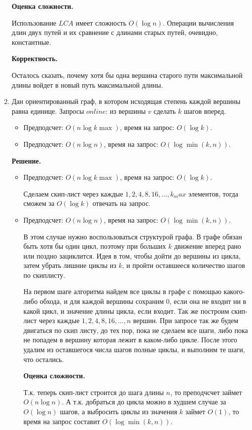 \begin{enumerate}
	\textbf{Оценка сложности.} 
	
	Использование $LCA$ имеет сложность $O(\log n)$. Операции вычисления длин двух путей и их 
	сравнение с длинами старых путей, очевидно, константные.
	
	\textbf{Корректность.} 
	
	Осталось сказать, почему хотя бы одна вершина старого пути максимальной длины войдет в 
	новый путь максимальной длины. 
	
	\item Дан ориентированный граф, в котором исходящая степень каждой вершины равна единице.
	Запросы $online$: из вершины $v$ сделать $k$ шагов вперед.
	\begin{itemize}
		\item Предподсчет: $O(n \log k\max)$, время на запрос: $O(\log k)$.
		\item Предподсчет: $O(n \log n)$, время на запрос: $O(\log \min(k, n))$.
	\end{itemize}
	
	\textbf{Решение.}
	
	\begin{itemize}
		\item Предподсчет: $O(n \log k\max)$, время на запрос: $O(\log k)$.
		
		Сделаем скип-лист через каждые $1, 2, 4, 8, 16, ..., k_max$ элементов, тогда сможем за $O(\log k)$ отвечать на запрос.
		\item Предподсчет: $O(n \log n)$, время на запрос: $O(\log \min(k, n))$.
		
		В этом случае нужно воспользоваться структурой графа. В графе обязан быть хотя бы один 
		цикл, поэтому при больших $k$ движение вперед рано или поздно зациклится. Идея в том, 
		чтобы дойти до вершины из цикла, затем убрать лишние циклы из $k$, и пройти оставшееся 
		количество шагов по скиплисту.
		
		На первом шаге алгоритма найдем все циклы в графе с помощью какого-либо обхода, и для 
		каждой вершины сохраним 0, если она не входит ни в какой цикл, и значение длины цикла, 
		если входит. Так же построим скип-лист через каждые $1, 2, 4, 8, 16, ..., n$ вершин. 
		При запросе так же будем двигаться по скип листу, до тех пор, пока не сделаем все шаги, 
		либо пока не попадем в вершину которая лежит в каком-либо цикле. После этого удалим из 
		оставшегося числа шагов полные циклы, и выполним те шаги, что остались. 
		
		\textbf{Оценка сложности.} 
		
		Т.к. теперь скип-лист строится до шага длины $n$, то преподчсчет займет $O(n \log n)$. 
		А т.к. добраться до цикла можно в худшем случае за $O(\log n )$ шагов, а выбросить 
		циклы из значения $k$ займет $O(1)$, то время на запрос составит $O(\log \min(k,n))$. 
	\end{itemize}
	

\end{enumerate}
